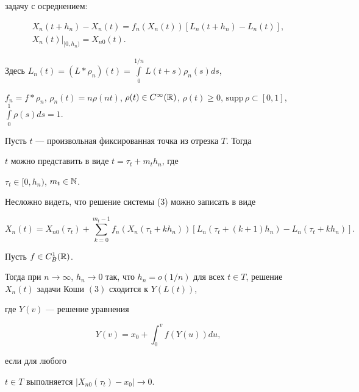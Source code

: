 задачу с осреднением: 


\begin{equation}


\begin{array}{c}


X_n(t+h_n)-X_n(t)=f_n(X_n(t))[L_n(t+h_n)-L_n(t)],\\[2mm]


X_n(t)|_{[0, h_n)}=X_{n0}(t).


\end{array}


\end{equation}


Здесь $L_n(t)=(L*\rho_n)(t)=\int\limits_0^{1/n}L(t+s)\rho_n(s)ds$,


$f_n=f*\rho_n$, $\rho_n(t)=n\rho(n t)$, $\rho(t)\in


C^{\infty}(\Bbb{R})$, $\rho(t)\geq 0$, $\mathrm{supp}\,\rho \subset


[0,1]$, $\int\limits_0^{1}\rho(s)ds=1$.





Пусть $t$ --- произвольная фиксированная точка из отрезка $T$. Тогда


$t$ можно представить в виде $t=\tau_t+m_th_n$, где


$\tau_t\in [0,h_n)$, $m_t\in \Bbb{N}$.


Несложно видеть, что решение системы (3) можно записать в виде


$$


X_n(t)=X_{n0}(\tau_t)+\sum_{k=0}^{m_t-1}f_n


(X_n(\tau_t+kh_n))[L_n(\tau_t +(k+1)h_n) - L_n(\tau_t +kh_n)].


$$








\begin{thm}


Пусть $f\in C_B^1(\Bbb{R})$.


Тогда при $n\to\infty$, $h_n\to 0$ так, что $h_n=o(1/n)$ для всех $t


\in T$, решение $X_n(t)$ задачи Коши $(3)$ сходится к $Y(L(t))$,


где $Y(v)$ --- решение уравнения


\begin{equation}


Y(v)=x_0+\int_0^vf(Y(u))du,


\end{equation}


если для любого


$t\in T$ выполняется $|X_{n0}(\tau_t)-x_0|\to0$.


\end{thm}





